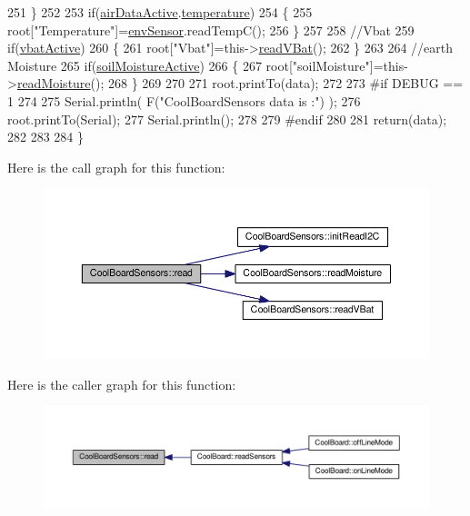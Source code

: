 \begin{DoxyCode}
251     \}   
252     
253     \textcolor{keywordflow}{if}(\hyperlink{classCoolBoardSensors_abff8dfeccb2f7689847bb64d5f1cd31e}{airDataActive}.\hyperlink{structCoolBoardSensors_1_1airActive_a9a6633c426b0508e30ebc1832ec6d745}{temperature})
254     \{
255         root[\textcolor{stringliteral}{"Temperature"}]=\hyperlink{classCoolBoardSensors_a868e38985e9a2412829fa2790ca13e2e}{envSensor}.readTempC();
256     \}
257     
258     \textcolor{comment}{//Vbat}
259     \textcolor{keywordflow}{if}(\hyperlink{classCoolBoardSensors_af5039ad760b0ff0aa7eee16c55e81702}{vbatActive})    
260     \{   
261         root[\textcolor{stringliteral}{"Vbat"}]=this->\hyperlink{classCoolBoardSensors_a6944b6ea7bce8e2fce1b434acfd9d5f3}{readVBat}();
262     \}
263     
264     \textcolor{comment}{//earth Moisture}
265     \textcolor{keywordflow}{if}(\hyperlink{classCoolBoardSensors_a31983eecc0f9cd000e1f912206ea4dc8}{soilMoistureActive})
266     \{   
267         root[\textcolor{stringliteral}{"soilMoisture"}]=this->\hyperlink{classCoolBoardSensors_a8761bff50373c485f4465c8db47d0633}{readMoisture}();
268     \}
269     
270     
271     root.printTo(data);
272 
273 \textcolor{preprocessor}{#if DEBUG == 1}
274 
275     Serial.println( F(\textcolor{stringliteral}{"CoolBoardSensors data is :"}) );
276     root.printTo(Serial);
277     Serial.println();
278 
279 \textcolor{preprocessor}{#endif}
280 
281     \textcolor{keywordflow}{return}(data);   
282     
283 
284 \}
\end{DoxyCode}
Here is the call graph for this function\+:\nopagebreak
\begin{figure}[H]
\begin{center}
\leavevmode
\includegraphics[width=350pt]{classCoolBoardSensors_a91badb2539d91fda8679f2a597874c48_cgraph}
\end{center}
\end{figure}
Here is the caller graph for this function\+:\nopagebreak
\begin{figure}[H]
\begin{center}
\leavevmode
\includegraphics[width=350pt]{classCoolBoardSensors_a91badb2539d91fda8679f2a597874c48_icgraph}
\end{center}
\end{figure}
